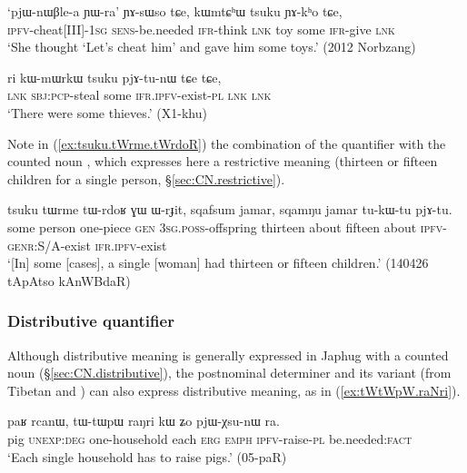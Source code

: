 \begin{exe}
\ex \label{ex:kWmtChW.tsuku}
\gll  `pjɯ-nɯβle-a ɲɯ-ra' ɲɤ-sɯso tɕe, kɯmtɕʰɯ tsuku ɲɤ-kʰo tɕe, \\
\textsc{ipfv}-cheat[III]-\textsc{1sg} \textsc{sens}-be.needed \textsc{ifr}-think \textsc{lnk} toy some \textsc{ifr}-give \textsc{lnk} \\
\glt `She thought `Let's cheat him' and gave him some toys.' (2012 Norbzang)
\end{exe}

\begin{exe}
\ex \label{ex:kWmWrkW.tsuku}
\gll ri kɯ-mɯrkɯ tsuku pjɤ-tu-nɯ tɕe tɕe, \\
\textsc{lnk} \textsc{sbj}:\textsc{pcp}-steal some \textsc{ifr}.\textsc{ipfv}-exist-\textsc{pl} \textsc{lnk} \textsc{lnk} \\
\glt `There were some thieves.' (X1-khu)
\end{exe}

Note in (\ref{ex:tsuku.tWrme.tWrdoR}) the combination of the quantifier  with the counted noun , which expresses here a restrictive meaning (thirteen or fifteen children for a single person, §\ref{sec:CN.restrictive}).

\begin{exe}
\ex \label{ex:tsuku.tWrme.tWrdoR}
\gll tsuku tɯrme tɯ-rdoʁ ɣɯ ɯ-rɟit, sqafsum jamar, sqamŋu jamar tu-kɯ-tu pjɤ-tu. \\
 some person one-piece \textsc{gen} \textsc{3sg}.\textsc{poss}-offspring thirteen about fifteen about \textsc{ipfv}-\textsc{genr}:S/A-exist \textsc{ifr}.\textsc{ipfv}-exist    \\
\glt  `[In] some [cases], a single [woman] had thirteen or fifteen children.' (140426 tApAtso kAnWBdaR)
\end{exe}
 
\subsubsection{Distributive quantifier} \label{sec:raNri}
 Although distributive meaning is generally expressed in Japhug with a counted noun (§\ref{sec:CN.distributive}), the postnominal determiner  and its variant  (from Tibetan  and ) can also express distributive meaning, as in (\ref{ex:tWtWpW.raNri}). 
 
\begin{exe}
\ex \label{ex:tWtWpW.raNri}
\gll paʁ rcanɯ, tɯ-tɯpɯ raŋri kɯ ʑo pjɯ-χsu-nɯ ra.\\
pig \textsc{unexp}:\textsc{deg} one-household each \textsc{erg} \textsc{emph} \textsc{ipfv}-raise-\textsc{pl} be.needed:\textsc{fact}\\
\glt `Each single household has to raise pigs.' (05-paR) 
 \end{exe}
 
